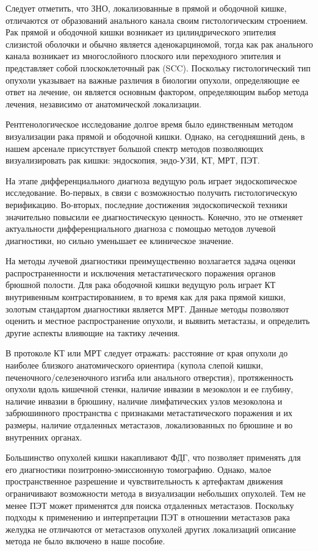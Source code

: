 \documentclass[
  russian,
  12pt,
  a4paper,
]{report}
\begin{document}
Следует отметить, что ЗНО, локализованные в прямой и ободочной кишке,
отличаются от образований анального канала своим гистологическим
строением. Рак прямой и ободочной кишки возникает из цилиндрического
эпителия слизистой оболочки и обычно является аденокарциномой, тогда как
рак анального канала возникает из многослойного плоского или переходного
эпителия и представляет собой плоскоклеточный рак (SCC). Поскольку
гистологический тип опухоли указывает на важные различия в биологии
опухоли, определяющие ее ответ на лечение, он является основным
фактором, определяющим выбор метода лечения, независимо от анатомической
локализации.

Рентгенологическое исследование долгое время было единственным методом
визуализации рака прямой и ободочной кишки. Однако, на сегодняшний день,
в нашем арсенале присутствует большой спектр методов позволяющих
визуализировать рак кишки: эндоскопия, эндо-УЗИ, КТ, МРТ, ПЭТ.

На этапе дифференциального диагноза ведущую роль играет эндоскопическое
исследование. Во-первых, в связи с возможностью получить гистологическую
верификацию. Во-вторых, последние достижения эндоскопической техники
значительно повысили ее диагностическую ценность. Конечно, это не
отменяет актуальности дифференциального диагноза с помощью методов
лучевой диагностики, но сильно уменьшает ее клиническое значение.

На методы лучевой диагностики преимущественно возлагается задача оценки
распространенности и исключения метастатического поражения органов
брюшной полости. Для рака ободочной кишки ведущую роль играет КТ
внутривенным контрастированием, в то время как для рака прямой кишки,
золотым стандартом диагностики является МРТ. Данные методы позволяют
оценить и местное распространение опухоли, и выявить метастазы, и
определить другие аспекты влияющие на тактику лечения.

В протоколе КТ или МРТ следует отражать: расстояние от края опухоли до
наиболее близкого анатомического ориентира (купола слепой кишки,
печеночного/селезеночного изгиба или анального отверстия), протяженность
опухоли вдоль кишечной стенки, наличие инвазии в мезоколон и ее глубину,
наличие инвазии в брюшину, наличие лимфатических узлов мезоколона и
забрюшинного пространства с признаками метастатического поражения и их
размеры, наличие отдаленных метастазов, локализованных по брюшине и во
внутренних органах.

Большинство опухолей кишки накапливают ФДГ, что позволяет применять для
его диагностики позитронно-эмиссионную томографию. Однако, малое
пространственное разрешение и чувствительность к артефактам движения
ограничивают возможности метода в визуализации небольших опухолей. Тем
не менее ПЭТ может применятся для поиска отдаленных метастазов.
Поскольку подходы к применению и интерпретации ПЭТ в отношении
метастазов рака желудка не отличаются от метастазов опухолей других
локализаций описание метода не было включено в наше пособие.
\end{document}
